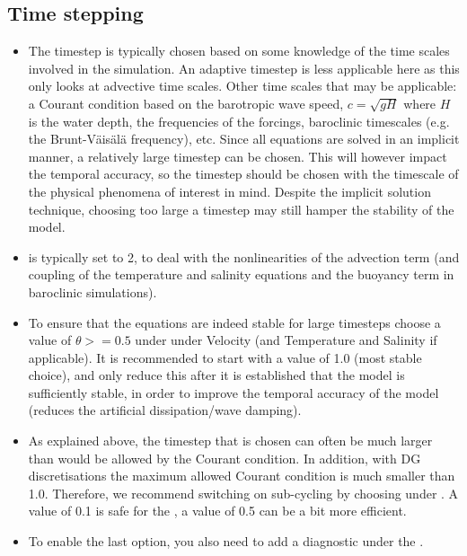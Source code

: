 \subsection{Time stepping}
\begin{itemize}
\item The timestep is typically chosen based on some knowledge of the time scales
  involved in the simulation. An adaptive timestep is less applicable here as
  this only looks at advective time scales. Other time scales that may be
  applicable: a Courant condition based on the barotropic wave speed, $c=\sqrt{gH}$ where
  $H$ is the water depth, the frequencies of the forcings, baroclinic timescales
  (e.g. the Brunt-V\"ais\"al\"a frequency), etc. Since all equations are solved in
  an implicit manner, a relatively large timestep can be chosen. This will
  however impact the temporal accuracy, so the timestep should be chosen with
  the timescale of the physical phenomena of interest in mind. Despite the
  implicit solution technique, choosing too large a timestep may still hamper
  the stability of the model.
\item {} is typically set to 2, to
  deal with the nonlinearities of the advection term (and coupling of the
  temperature and salinity equations and the buoyancy term in baroclinic
  simulations).
\item To ensure that the equations are indeed stable for large timesteps choose
  a value of $\theta>=0.5$ under 
  under Velocity (and Temperature and Salinity if applicable). It is
  recommended to start with a value of 1.0 (most stable choice), and only
  reduce this after it is established that the model is sufficiently stable, in
  order to improve the temporal accuracy of the model (reduces the artificial 
  dissipation/wave damping).
\item As explained above, the timestep that is chosen can often be much larger
  than would be allowed by the Courant condition. In addition, with DG
  discretisations the maximum allowed Courant condition is much smaller than
  1.0. Therefore, we recommend switching on sub-cycling by choosing
   under
  . A value of 0.1 is safe for the
  , a value of 0.5 can be a
  bit more efficient.
\item To enable the last option, you also need to add a
  diagnostic  under the
  .
\end{itemize}

